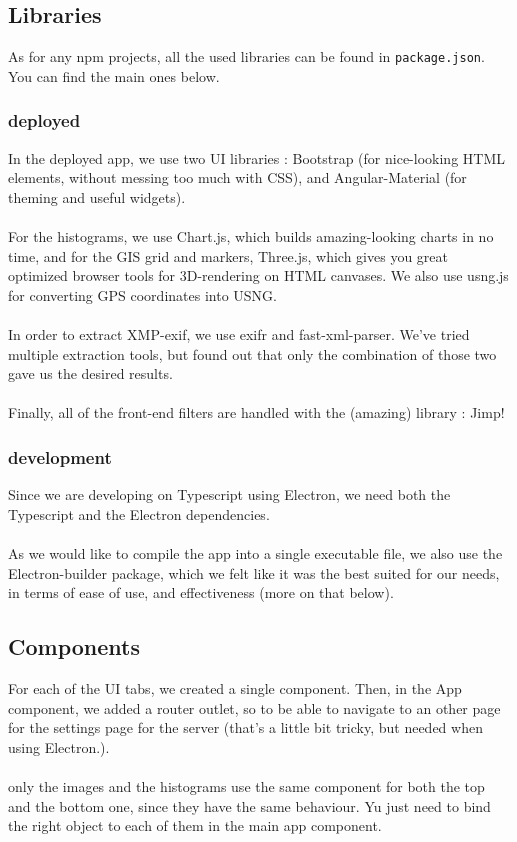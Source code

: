 \documentclass[12pt,a4paper]{article}
\begin{document}
\subsection{Libraries}

As for any npm projects, all the used libraries can be found in \texttt{package.json}. You can find the main ones below.

\subsubsection{deployed}

In the deployed app, we use two UI libraries : Bootstrap (for nice-looking HTML elements, without messing too much with CSS), and Angular-Material (for theming and useful widgets).\\
~\\
For the histograms, we use Chart.js, which builds amazing-looking charts in no time, and for the GIS grid and markers, Three.js, which gives you great optimized browser tools for 3D-rendering on HTML canvases. We also use usng.js for converting GPS coordinates into USNG.\\
~\\
In order to extract XMP-exif, we use exifr and fast-xml-parser. We've tried multiple extraction tools, but found out that only the combination of those two gave us the desired results.\\
~\\
Finally, all of the front-end filters are handled with the (amazing) library : Jimp!

\subsubsection{development}
Since we are developing on Typescript using Electron, we need both the Typescript and the Electron dependencies.\\
~\\
As we would like to compile the app into a single executable file, we also use the Electron-builder package, which we felt like it was the best suited for our needs, in terms of ease of use, and effectiveness (more on that below).

\subsection{Components}

For each of the UI tabs, we created a single component. Then, in the App component, we added a router outlet, so to be able to navigate to an other page for the settings page for the server (that's a little bit tricky, but needed when using Electron.).\\
~\\
only the images and the histograms use the same component for both the top and the bottom one, since they have the same behaviour. Yu just need to bind the right object to each of them in the main app component.
\end{document}

